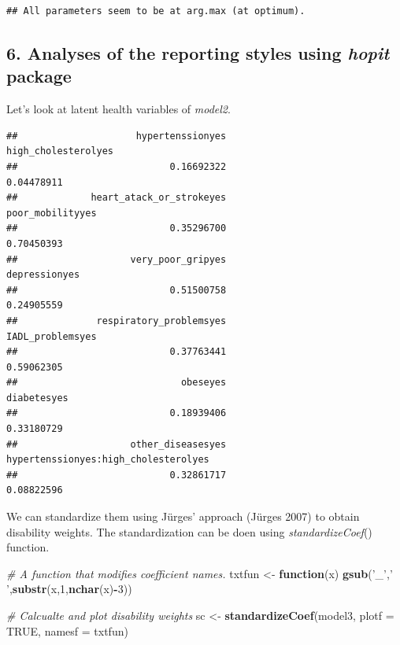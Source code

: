 \documentclass[]{article}
\newenvironment{Shaded}{\begin{snugshade}}{\end{snugshade}}
\newcommand{\CommentTok}[1]{\textcolor[rgb]{0.56,0.35,0.01}{\textit{#1}}}
\newcommand{\ControlFlowTok}[1]{\textcolor[rgb]{0.13,0.29,0.53}{\textbf{#1}}}
\newcommand{\DataTypeTok}[1]{\textcolor[rgb]{0.13,0.29,0.53}{#1}}
\newcommand{\DecValTok}[1]{\textcolor[rgb]{0.00,0.00,0.81}{#1}}
\newcommand{\KeywordTok}[1]{\textcolor[rgb]{0.13,0.29,0.53}{\textbf{#1}}}
\newcommand{\NormalTok}[1]{#1}
\newcommand{\OperatorTok}[1]{\textcolor[rgb]{0.81,0.36,0.00}{\textbf{#1}}}
\newcommand{\OtherTok}[1]{\textcolor[rgb]{0.56,0.35,0.01}{#1}}
\newcommand{\StringTok}[1]{\textcolor[rgb]{0.31,0.60,0.02}{#1}}
\begin{document}
\begin{verbatim}
## All parameters seem to be at arg.max (at optimum).
\end{verbatim}

\hypertarget{analyses-of-the-reporting-styles-using-hopit-package}{%
\subsection{\texorpdfstring{6. Analyses of the reporting styles using
\emph{hopit}
package}{6. Analyses of the reporting styles using hopit package}}\label{analyses-of-the-reporting-styles-using-hopit-package}}

Let's look at latent health variables of \emph{model2}.

\begin{Shaded}
\end{Shaded}

\begin{verbatim}
##                     hypertenssionyes                  high_cholesterolyes 
##                           0.16692322                           0.04478911 
##             heart_atack_or_strokeyes                     poor_mobilityyes 
##                           0.35296700                           0.70450393 
##                    very_poor_gripyes                        depressionyes 
##                           0.51500758                           0.24905559 
##              respiratory_problemsyes                     IADL_problemsyes 
##                           0.37763441                           0.59062305 
##                             obeseyes                          diabetesyes 
##                           0.18939406                           0.33180729 
##                    other_diseasesyes hypertenssionyes:high_cholesterolyes 
##                           0.32861717                           0.08822596
\end{verbatim}

We can standardize them using Jürges' approach (Jürges 2007) to obtain
disability weights. The standardization can be doen using
\emph{standardizeCoef}() function.

\begin{Shaded}
\begin{Highlighting}[]
\CommentTok{# A function that modifies coefficient names.  }
\NormalTok{txtfun <-}\StringTok{ }\ControlFlowTok{function}\NormalTok{(x) }\KeywordTok{gsub}\NormalTok{(}\StringTok{'_'}\NormalTok{,}\StringTok{' '}\NormalTok{,}\KeywordTok{substr}\NormalTok{(x,}\DecValTok{1}\NormalTok{,}\KeywordTok{nchar}\NormalTok{(x)}\OperatorTok{-}\DecValTok{3}\NormalTok{))}

\CommentTok{# Calcualte and plot disability weights}
\NormalTok{sc <-}\StringTok{ }\KeywordTok{standardizeCoef}\NormalTok{(model3, }\DataTypeTok{plotf =} \OtherTok{TRUE}\NormalTok{, }\DataTypeTok{namesf =}\NormalTok{ txtfun)}
\end{Highlighting}
\end{Shaded}
\end{document}
